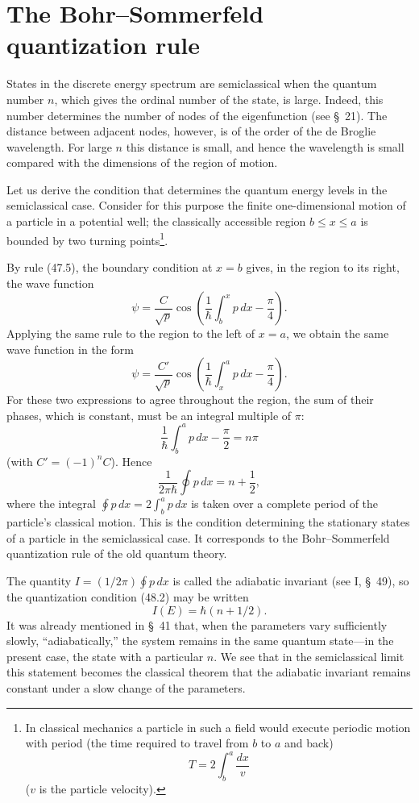 \section{The Bohr--Sommerfeld quantization rule}

States in the discrete energy spectrum are semiclassical when the quantum
number $n$, which gives the ordinal number of the state, is large. Indeed,
this number determines the number of nodes of the eigenfunction (see §~21).
The distance between adjacent nodes, however, is of the order of the de
Broglie wavelength. For large $n$ this distance is small, and hence the
wavelength is small compared with the dimensions of the region of motion.

Let us derive the condition that determines the quantum energy levels in the
semiclassical case. Consider for this purpose the finite one-dimensional
motion of a particle in a potential well; the classically accessible region
$b\leq x\leq a$ is bounded by two turning points\footnote{In classical
mechanics a particle in such a field would execute periodic motion with period
(the time required to travel from $b$ to $a$ and back)
\[
  T=2\int_b^a\frac{dx}{v}
\]
($v$ is the particle velocity).}.

By rule (47.5), the boundary condition at $x=b$ gives, in the region to its
right, the wave function
\begin{equation}
  \psi=\frac C{\sqrt p}\cos\left(\frac1\hbar\int_b^x p\,dx-\frac\pi4\right).
  \tag{48.1}
\end{equation}
Applying the same rule to the region to the left of $x=a$, we obtain the same
wave function in the form
\[
  \psi=\frac{C'}{\sqrt p}\cos\left(\frac1\hbar\int_x^a p\,dx-\frac\pi4\right).
\]
For these two expressions to agree throughout the region, the sum of their
phases, which is constant, must be an integral multiple of $\pi$:
\[
  \frac1\hbar\int_b^a p\,dx-\frac\pi2=n\pi
\]
(with $C'=(-1)^nC$). Hence
\begin{equation}
  \frac1{2\pi\hbar}\oint p\,dx=n+\frac12,
  \tag{48.2}
\end{equation}
where the integral $\oint p\,dx=2\int_b^a p\,dx$ is taken over a complete
period of the particle's classical motion. This is the condition determining
the stationary states of a particle in the semiclassical case. It corresponds
to the Bohr--Sommerfeld quantization rule of the old quantum theory.

The quantity $I=(1/2\pi)\oint p\,dx$ is called the adiabatic invariant (see
I, §~49), so the quantization condition (48.2) may be written
\[
  I(E)=\hbar(n+1/2).
\]
It was already mentioned in §~41 that, when the parameters vary sufficiently
slowly, ``adiabatically,'' the system remains in the same quantum state---in
the present case, the state with a particular $n$. We see that in the
semiclassical limit this statement becomes the classical theorem that the
adiabatic invariant remains constant under a slow change of the parameters.

